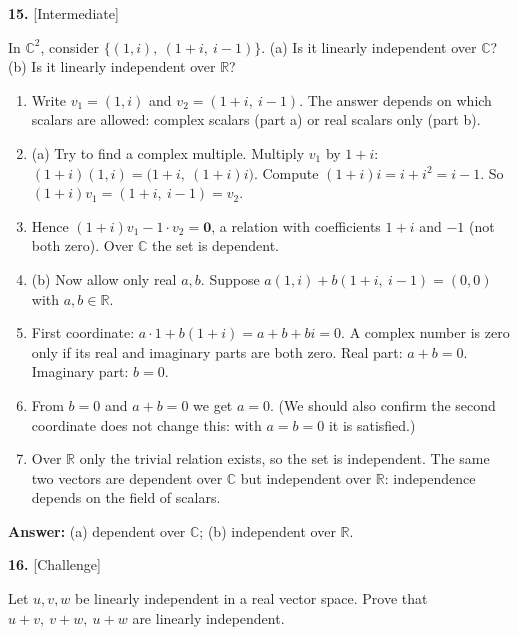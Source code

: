 \documentclass[11pt]{article}
\begin{document}
\par\vspace{2pt}
\begin{minipage}{\linewidth}\textbf{15.} \hfill{\scriptsize\color{ink}[Intermediate]}\par\nopagebreak In $\mathbb{C}^{2}$, consider $\{(1,i),\ (1+i,\ i-1)\}$. (a) Is it linearly independent over $\mathbb{C}$? (b) Is it linearly independent over $\mathbb{R}$?
\end{minipage}\par\nopagebreak
\begin{tcolorbox}[breakable,colback=ans,colframe=ansb,boxrule=0.5pt,left=4pt,right=4pt,top=2pt,bottom=2pt]\begin{enumerate}[leftmargin=2.2em,itemsep=1pt,topsep=1pt,label=\textbf{Step \arabic*.}]\item Write $v_1=(1,i)$ and $v_2=(1+i,\ i-1)$. The answer depends on which scalars are allowed: complex scalars (part a) or real scalars only (part b).
\item (a) Try to find a complex multiple. Multiply $v_1$ by $1+i$: $(1+i)(1,i)=\big(1+i,\ (1+i)i\big)$. Compute $(1+i)i=i+i^{2}=i-1$. So $(1+i)v_1=(1+i,\ i-1)=v_2$.
\item Hence $(1+i)v_1-1\cdot v_2=\mathbf 0$, a relation with coefficients $1+i$ and $-1$ (not both zero). Over $\mathbb{C}$ the set is dependent.
\item (b) Now allow only real $a,b$. Suppose $a(1,i)+b(1+i,\ i-1)=(0,0)$ with $a,b\in\mathbb{R}$.
\item First coordinate: $a\cdot1+b(1+i)=a+b+bi=0$. A complex number is zero only if its real and imaginary parts are both zero. Real part: $a+b=0$. Imaginary part: $b=0$.
\item From $b=0$ and $a+b=0$ we get $a=0$. (We should also confirm the second coordinate does not change this: with $a=b=0$ it is satisfied.)
\item Over $\mathbb{R}$ only the trivial relation exists, so the set is independent. The same two vectors are dependent over $\mathbb{C}$ but independent over $\mathbb{R}$: independence depends on the field of scalars.
\end{enumerate}\textbf{Answer:} (a) dependent over $\mathbb{C}$; (b) independent over $\mathbb{R}$.\end{tcolorbox}
\par\vspace{2pt}
\begin{minipage}{\linewidth}\textbf{16.} \hfill{\scriptsize\color{ink}[Challenge]}\par\nopagebreak Let $u,v,w$ be linearly independent in a real vector space. Prove that $u+v,\ v+w,\ u+w$ are linearly independent.
\end{minipage}\par\nopagebreak
\end{document}
